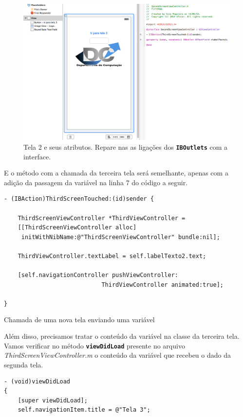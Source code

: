 \documentclass[a4paper,12pt,brazil,doubleside]{book}
\begin{document}
\begin{singlespace}
\begin{figure}[H]
  \centering
  \includegraphics[width=.99\textwidth]{figuras/3/tela_novo_projeto_44.png}
  \caption{Tela 2 e seus atributos. Repare nas as ligações dos \texttt{\textbf{IBOutlets}} com a interface.}
  \label{fig:a}
\end{figure}

E o método com a chamada da terceira tela será semelhante, apenas com a adição da passagem da variável na linha 7 do código a seguir.

\begin{listing}[H]
\begin{verbatim}
- (IBAction)ThirdScreenTouched:(id)sender {

    ThirdScreenViewController *ThirdViewController =
    [[ThirdScreenViewController alloc]
     initWithNibName:@"ThirdScreenViewController" bundle:nil];
    
    ThirdViewController.textLabel = self.labelTexto2.text;
    
    [self.navigationController pushViewController:
    						ThirdViewController animated:true];
    
}
\end{verbatim}
\caption{Chamada de uma nova tela enviando uma variável}
\end{listing}


Além disso, precisamos tratar o conteúdo da variável na classe da terceira tela. Vamos verificar no método \texttt{\textbf{viewDidLoad}} presente no arquivo \emph{ThirdScreenViewController.m} o conteúdo da variável que recebeu o dado da segunda tela.

\begin{listing}[H]
\begin{verbatim}
- (void)viewDidLoad
{
    [super viewDidLoad];
    self.navigationItem.title = @"Tela 3";
    

\end{verbatim}
\end{listing}
\end{singlespace}
\end{document}
